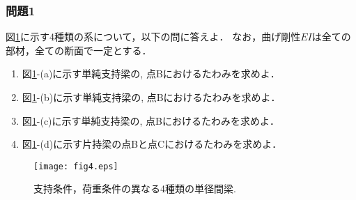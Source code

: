 \documentclass[10pt,a4j]{jarticle}
\begin{document}
\subsubsection{問題1}
図\ref{fig:fig2_4}に示す4種類の系について，以下の問に答えよ．
なお，曲げ剛性$EI$は全ての部材，全ての断面で一定とする．
\begin{enumerate}
\item
	図\ref{fig:fig2_4}-(a)に示す単純支持梁の, 点Bにおけるたわみを求めよ．
\item
	図\ref{fig:fig2_4}-(b)に示す単純支持梁の, 点Bにおけるたわみを求めよ．
\item
	図\ref{fig:fig2_4}-(c)に示す単純支持梁の, 点Bにおけるたわみを求めよ．
\item
	図\ref{fig:fig2_4}-(d)に示す片持梁の点Bと点Cにおけるたわみを求めよ．
\end{enumerate}
\begin{figure}[h]
	\begin{center}
	\texttt{[image: fig4.eps]} 
	\end{center}
	\caption{支持条件，荷重条件の異なる4種類の単径間梁.} 
	\label{fig:fig2_4}
\end{figure}
\end{document}
